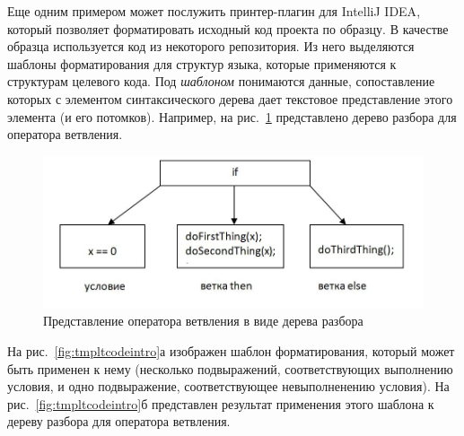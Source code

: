 Еще одним примером может послужить принтер-плагин для IntelliJ IDEA\cite{podkopaev:diploma}, который позволяет форматировать исходный код проекта по образцу. 
В качестве образца используется код из некоторого репозитория. 
Из него выделяются шаблоны форматирования для структур языка, которые применяются к структурам целевого кода. 
Под \textit{шаблоном} понимаются данные, сопоставление которых с элементом синтаксического дерева дает текстовое представление этого элемента (и его потомков). 
Например, на рис.~\ref{fig:ifTree} представлено дерево разбора для оператора ветвления. 


\begin{figure}[h]
	\centering
	\includegraphics[width=\textwidth]{images/ifTree.jpg}
	\caption{Представление оператора ветвления в виде дерева разбора}
	\label{fig:ifTree}
\end{figure}

На рис.~\ref{fig:tmpltcodeintro}а изображен шаблон форматирования, который может быть применен к нему (несколько подвыражений, соответствующих выполнению условия, и одно подвыражение, соответствующее невыполненению условия).
На рис.~\ref{fig:tmpltcodeintro}б представлен результат применения этого шаблона к дереву разбора для оператора ветвления.

% 	


% 	


